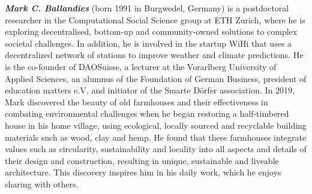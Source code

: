 \documentclass[a4paper]{article}
\begin{document}
\textbf{\textit{Mark C. Ballandies}} (born 1991 in Burgwedel, Germany) is a postdoctoral researcher in the Computational Social Science group at ETH Zurich, where he is exploring decentralised, bottom-up and community-owned solutions to complex societal challenges. In addition, he is involved in the startup WiHi that uses a decentralized network of stations to improve weather and climate predictions. He is the co-founder of DAOSuisse, a lecturer at the Vorarlberg University of Applied Sciences, an alumnus of the Foundation of German Business, president of education matters e.V. and initiator of the Smarte Dörfer association. In 2019, Mark discovered the beauty of old farmhouses and their effectiveness in combating environmental challenges when he began restoring a half-timbered house in his home village, using ecological, locally sourced and recyclable building materials such as wood, clay and hemp. He found that these farmhouses integrate values such as circularity, sustainability and locality into all aspects and details of their design and construction, resulting in unique, sustainable and liveable architecture. This discovery inspires him in his daily work, which he enjoys sharing with others.
\end{document}

